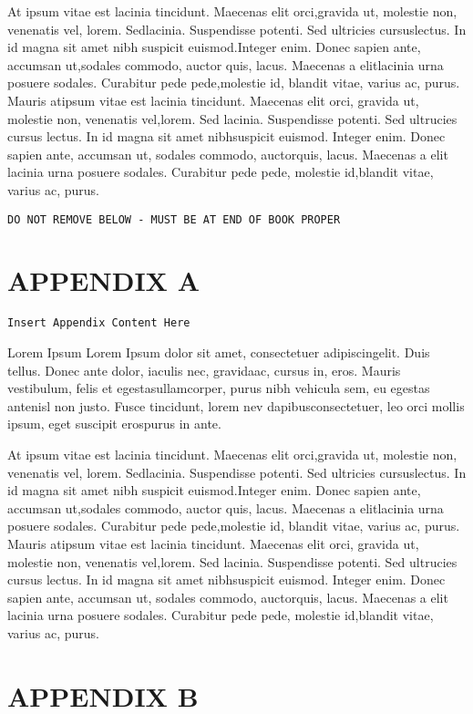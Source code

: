 \documentclass[openleft,oneside,showtrims]{memoir}
\begin{document}
At ipsum vitae est lacinia tincidunt. Maecenas elit orci,gravida ut, molestie non, venenatis vel, lorem. Sedlacinia. Suspendisse potenti. Sed ultricies cursuslectus. In id magna sit amet nibh suspicit euismod.Integer enim. Donec sapien ante, accumsan ut,sodales commodo, auctor quis, lacus. Maecenas a elitlacinia urna posuere sodales. Curabitur pede pede,molestie id, blandit vitae, varius ac, purus. Mauris atipsum vitae est lacinia tincidunt. Maecenas elit orci, gravida ut, molestie non, venenatis vel,lorem. Sed lacinia. Suspendisse potenti. Sed ultrucies cursus lectus. In id magna sit amet nibhsuspicit euismod. Integer enim. Donec sapien ante, accumsan ut, sodales commodo, auctorquis, lacus. Maecenas a elit lacinia urna posuere sodales. Curabitur pede pede, molestie id,blandit vitae, varius ac, purus.

\texttt{DO NOT REMOVE BELOW - MUST BE AT END OF BOOK PROPER}

\backmatter
\appendix

\chapter{APPENDIX A}
\label{sec:orge7997bd}

\texttt{Insert Appendix Content Here}

Lorem Ipsum Lorem Ipsum dolor sit amet, consectetuer adipiscingelit. Duis tellus. Donec ante dolor, iaculis nec, gravidaac, cursus in, eros. Mauris vestibulum, felis et egestasullamcorper, purus nibh vehicula sem, eu egestas antenisl non justo. Fusce tincidunt, lorem nev dapibusconsectetuer, leo orci mollis ipsum, eget suscipit erospurus in ante.

At ipsum vitae est lacinia tincidunt. Maecenas elit orci,gravida ut, molestie non, venenatis vel, lorem. Sedlacinia. Suspendisse potenti. Sed ultricies cursuslectus. In id magna sit amet nibh suspicit euismod.Integer enim. Donec sapien ante, accumsan ut,sodales commodo, auctor quis, lacus. Maecenas a elitlacinia urna posuere sodales. Curabitur pede pede,molestie id, blandit vitae, varius ac, purus. Mauris atipsum vitae est lacinia tincidunt. Maecenas elit orci, gravida ut, molestie non, venenatis vel,lorem. Sed lacinia. Suspendisse potenti. Sed ultrucies cursus lectus. In id magna sit amet nibhsuspicit euismod. Integer enim. Donec sapien ante, accumsan ut, sodales commodo, auctorquis, lacus. Maecenas a elit lacinia urna posuere sodales. Curabitur pede pede, molestie id,blandit vitae, varius ac, purus.
\chapter{APPENDIX B}
\label{sec:org9c114ca}
\end{document}

